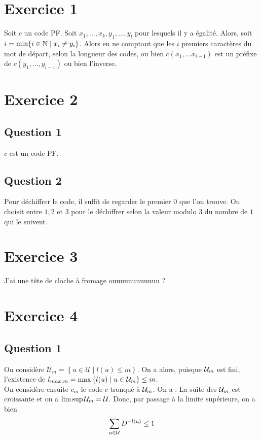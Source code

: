 \documentclass{cours}
\begin{document}
\section{Exercice 1}
Soit $c$ un code PF. Soit $x_1, \ldots, x_{k}, y_{1}, \ldots, y_{l}$ pour lesquels il y a égalité. Alors, soit $i = \min \{i \in \mathbb{N} \mid x_{i} \neq y_{i}\}$. Alors en ne comptant que les $i$ premiers caractères du mot de départ, selon la longueur des codes, ou bien $c(x_{1},\ldots x_{i - 1})$ est un préfixe de $c(y_{1}, \ldots, y_{i - 1})$ ou bien l'inverse.

\section{Exercice 2}
\subsection{Question 1}
$c$ est un code PF. 

\subsection{Question 2}
Pour déchiffrer le code, il suffit de regarder le premier $0$ que l'on trouve. On choisit entre $1, 2$ et $3$ pour le déchiffrer selon la valeur modulo $3$ du nombre de $1$ qui le suivent. 

\section{Exercice 3}
J'ai une tête de cloche à fromage ouuuuuuuuuuuu ?

\section{Exercice 4}
\subsection{Question 1}
On considère $\mathcal{U}_{m} = \left\{u \in \mathcal{U} \mid l(u) \leq m\right\}$. On a alors, puisque $\mathcal{U}_{m}$ est fini, l'existence de $l_{max, m} = \max \left\{l(u) \mid u \in \mathcal{U}_{m}\right\} \leq m$. \\
On considère ensuite $c_{m}$ le code $c$ tronqué à $\mathcal{U}_{m}$. On a :  
La suite des $\mathcal{U}_{m}$ est croissante et on a $\limsup \mathcal{U}_{m} = \mathcal{U}$. Donc, par passage à la limite supérieure, on a bien 
\[
    \sum_{u \in \mathcal{U}}D^{-l(u)} \leq 1
\]
\end{document}

